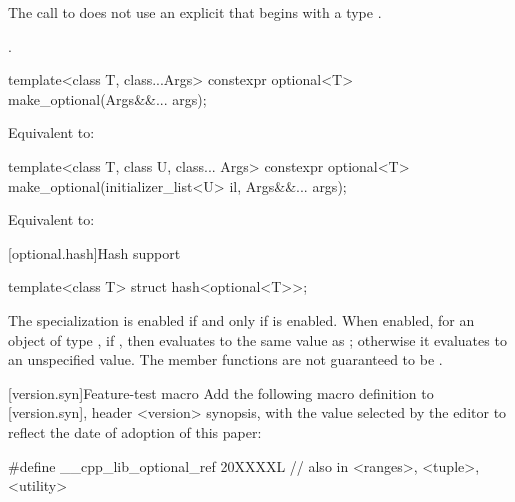 \begin{itemdescr}
\begin{addedblock}
\pnum
\constraints
The call to  does not use
an explicit  that
begins with a type .
\end{addedblock}

\pnum
\returns
{}.
\end{itemdescr}

%
\begin{itemdecl}
template<class T, class...Args>
  constexpr optional<T> make_optional(Args&&... args);
\end{itemdecl}

\begin{itemdescr}
\pnum
\effects
Equivalent to: 
\end{itemdescr}

%
\begin{itemdecl}
template<class T, class U, class... Args>
  constexpr optional<T> make_optional(initializer_list<U> il, Args&&... args);
\end{itemdecl}

\begin{itemdescr}
\pnum
\effects
Equivalent to: 
\end{itemdescr}


[optional.hash]{Hash support}
%
\begin{itemdecl}
template<class T> struct hash<optional<T>>;
\end{itemdecl}

\begin{itemdescr}
\pnum
The specialization  is enabled
if and only if  is enabled.
When enabled, for an object  of type ,
if , then 
evaluates to the same value as ;
otherwise it evaluates to an unspecified value.
The member functions are not guaranteed to be .
\end{itemdescr}

\begin{addedblock}
[version.syn]{Feature-test macro}
Add the following macro definition to [version.syn], header <version> synopsis, with the value selected by the editor to reflect the date of adoption of this paper:

\begin{codeblock}
  #define __cpp_lib_optional_ref 20XXXXL // also in <ranges>, <tuple>, <utility>
\end{codeblock}
\end{addedblock}
